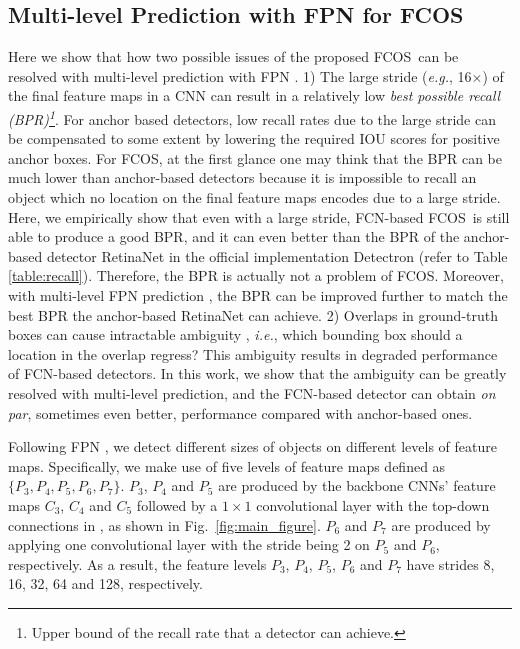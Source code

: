 \documentclass[10pt,twocolumn,letterpaper]{article}
\newcommand{\1}{{\mathbbm{1}}}           %
\def\Ours{{FCNDet}\xspace}
\def\Ours{{FCOS}\xspace}
\def\eg{{\it e.g.}\xspace}
\begin{document}
\subsection{Multi-level Prediction with FPN for \Ours}
%
Here we show that how two possible issues of the proposed \Ours\ can be resolved with multi-level prediction with FPN \cite{lin2017feature}.
1) The large stride (\eg, 16$\times$) of the final feature maps in a 
%
CNN  %
can result in a relatively low {\it best possible recall (BPR)\footnote{Upper bound of the recall rate that a detector can achieve.}}.
%
For anchor based detectors, low recall rates due to the large stride can be compensated to some extent by lowering  the required IOU scores for positive anchor boxes. 
%
For \Ours, at the first glance 
one may think that the BPR can be much lower than anchor-based detectors because   
it is impossible to recall an object %
which no location on the final feature maps  
encodes    
due to a large stride.  %
Here,  
we empirically show that even with a large stride, FCN-based \Ours\ is still able to produce a good BPR, and it  can even better than the BPR of the anchor-based detector RetinaNet \cite{lin2017focal} in the official implementation  Detectron \cite{Detectron2018}
 (refer to Table \ref{table:recall}).
 Therefore, the BPR is actually not a problem of \Ours. Moreover, with multi-level  FPN prediction  \cite{lin2017feature}, the BPR can be improved further to match 
%
%
%
the best BPR the anchor-based RetinaNet can achieve. 2) Overlaps  in ground-truth boxes can cause 
intractable ambiguity %
, {\it i.e.}, which bounding box should a location in the overlap regress? 
This ambiguity results in degraded performance of  FCN-based detectors. In this work, we show that the ambiguity can be greatly resolved with multi-level prediction, and the FCN-based detector can obtain {\it on par}, sometimes even better, performance compared with anchor-based ones.


Following FPN \cite{lin2017feature}, we detect different sizes of objects on different levels of feature maps. Specifically, we make use of five levels of feature maps defined as $\{P_3, P_4, P_5, P_6, P_7\}$. $P_3$, $P_4$ and $P_5$ are produced by the backbone CNNs' feature maps $C_3$, $C_4$ and $C_5$ followed by a $1 \times 1$ convolutional layer with the top-down connections in \cite{lin2017feature}, as shown in Fig.~\ref{fig:main_figure}. $P_6$ and $P_7$ are produced by applying one convolutional layer with the stride being 2 on $P_5$ and $P_6$, respectively. As a result, the feature levels $P_3$, $P_4$, $P_5$, $P_6$ and $P_7$ have strides 8, 16, 32, 64 and 128, respectively.
\end{document}

